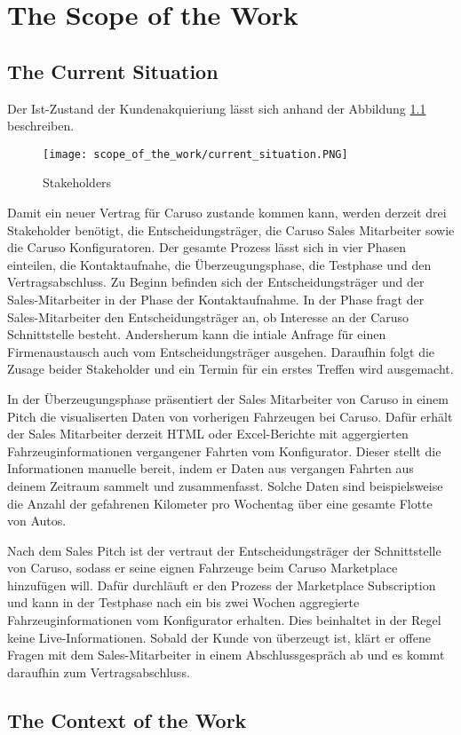 \chapter{The Scope of the Work}

\section{The Current Situation}
Der Ist-Zustand der Kundenakquieriung lässt sich anhand der Abbildung \ref{ScopeOfWork:Situation} beschreiben.
\begin{figure}[ht]
  \centering
  \texttt{[image: scope\_of\_the\_work/current\_situation.PNG]}
  \caption{Stakeholders}
  \label{ScopeOfWork:Situation}
\end{figure}
Damit ein neuer Vertrag für Caruso zustande kommen kann, werden derzeit drei Stakeholder benötigt, die Entscheidungsträger, die Caruso Sales Mitarbeiter sowie die Caruso Konfiguratoren. Der gesamte Prozess lässt sich in vier Phasen einteilen, die Kontaktaufnahe, die Überzeugungsphase, die Testphase und den Vertragsabschluss.
Zu Beginn befinden sich der Entscheidungsträger und der Sales-Mitarbeiter in der Phase der Kontaktaufnahme. In der Phase fragt der Sales-Mitarbeiter den Entscheidungsträger an, ob Interesse an der Caruso Schnittstelle besteht. Andersherum kann die intiale Anfrage für einen Firmenaustausch auch vom Entscheidungsträger ausgehen. Daraufhin folgt die Zusage beider Stakeholder und ein Termin für ein erstes Treffen wird ausgemacht.

In der Überzeugungsphase präsentiert der Sales Mitarbeiter von Caruso in einem Pitch die visualiserten Daten von vorherigen Fahrzeugen bei Caruso. Dafür erhält der Sales Mitarbeiter derzeit HTML oder Excel-Berichte mit aggergierten Fahrzeuginformationen vergangener Fahrten vom Konfigurator. Dieser stellt die Informationen manuelle bereit, indem er Daten aus vergangen Fahrten aus deinem Zeitraum sammelt und zusammenfasst. Solche Daten sind beispielsweise die Anzahl der gefahrenen Kilometer pro Wochentag über eine gesamte Flotte von Autos.

Nach dem Sales Pitch ist der vertraut der Entscheidungsträger der Schnittstelle von Caruso, sodass er seine eignen Fahrzeuge beim Caruso Marketplace hinzufügen will. Dafür durchläuft er den Prozess der Marketplace Subscription und kann in der Testphase nach ein bis zwei Wochen aggregierte Fahrzeuginformationen vom Konfigurator erhalten. Dies beinhaltet in der Regel keine Live-Informationen.
Sobald der Kunde von überzeugt ist, klärt er offene Fragen mit dem Sales-Mitarbeiter in einem Abschlussgespräch ab und es kommt daraufhin zum Vertragsabschluss.
\section{The Context of the Work}
